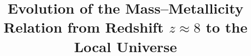 \documentclass[twocolumn]{aastex631}
\begin{document}
\title{Evolution of the Mass--Metallicity Relation from Redshift $z\approx8$ to the Local Universe}


\end{document}
